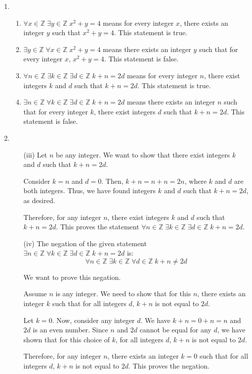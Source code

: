 \documentclass{article}
\newcommand{\Z}{\mathbb{Z}}
\theoremstyle{definition}
\begin{document}
\begin{solution}
\begin{enumerate}
    \item 
\begin{enumerate}
    \item $\forall x \in \Z \; \exists y \in \Z \; x^2 + y = 4$ means for every integer $x$, there exists an integer $y$ such that $x^2 + y = 4$. This statement is true.
    \item $\exists y \in \Z \; \forall x \in \Z \; x^2 + y = 4$ means there exists an integer $y$ such that for every integer $x$, $x^2 + y = 4$. This statement is false.
    \item $\forall n \in \Z \; \exists k \in \Z \; \exists d \in \Z \; k+ n = 2d$ means for every integer $n$, there exist integers $k$ and $d$ such that $k + n = 2d$. This statement is true.
    \item $\exists n \in \Z \; \forall k \in \Z \; \exists d \in \Z \; k+ n = 2d$ means there exists an integer $n$ such that for every integer $k$, there exist integers $d$ such that $k + n = 2d$. This statement is false.
\end{enumerate}
    \item 
\begin{enumerate}
    \item[(iii)]
Let \( n \) be any integer. We want to show that there exist integers \( k \) and \( d \) such that \( k + n = 2d \).

Consider \( k = n \) and \( d = 0 \). Then, \( k + n = n + n = 2n \), where \( k \) and \( d \) are both integers. Thus, we have found integers \( k \) and \( d \) such that \( k + n = 2d \), as desired.

Therefore, for any integer \( n \), there exist integers \( k \) and \( d \) such that \( k + n = 2d \). This proves the statement \( \forall n \in \Z \; \exists k \in \Z \; \exists d \in \Z \; k+ n = 2d \).


    \item[(iv)]
The negation of the given statement \( \exists n \in \Z \; \forall k \in \Z \; \exists d \in \Z \; k + n = 2d \) is:
\[ \forall n \in \Z \; \exists k \in \Z \; \forall d \in \Z \; k + n \neq 2d \]

We want to prove this negation.

Assume \( n \) is any integer. We need to show that for this \( n \), there exists an integer \( k \) such that for all integers \( d \), \( k + n \) is not equal to \( 2d \).

Let \( k = 0 \). Now, consider any integer \( d \). We have \( k + n = 0 + n = n \) and \( 2d \) is an even number. Since \( n \) and \( 2d \) cannot be equal for any \( d \), we have shown that for this choice of \( k \), for all integers \( d \), \( k + n \) is not equal to \( 2d \).

Therefore, for any integer \( n \), there exists an integer \( k = 0 \) such that for all integers \( d \), \( k + n \) is not equal to \( 2d \). This proves the negation.


    \end{enumerate}
\end{enumerate}
\end{solution}
\end{document}
